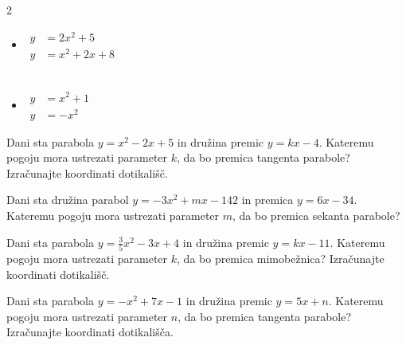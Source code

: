 \begin{naloga}
\begin{multicols}{2}
\begin{itemize}
                    \item $ \begin{aligned}
                        y&=2x^2+5 \\ y&=x^2+2x+8
                    \end{aligned} $ \\~

                    \item $ \begin{aligned}
                        y&=x^2+1 \\ y&=-x^2
                    \end{aligned} $
                \end{itemize}

            \end{multicols}

        \end{naloga}

        

            \begin{naloga}
                Dani sta parabola $y=x^2-2x+5$ in družina premic $y=kx-4$.
                Kateremu pogoju mora ustrezati parameter $k$, da bo premica tangenta parabole?
                Izračunajte koordinati dotikališč.
                                
            \end{naloga}


            \begin{naloga}
                Dani sta družina parabol $y=-3x^2+mx-142$ in premica $y=6x-34$.
                Kateremu pogoju mora ustrezati parameter $m$, da bo premica sekanta parabole?
                
            \end{naloga}


            \begin{naloga}
                Dani sta parabola $y=\frac{3}{5}x^2-3x+4$ in družina premic $y=kx-11$.
                Kateremu pogoju mora ustrezati parameter $k$, da bo premica mimobežnica?
                Izračunajte koordinati dotikališč.
                                
            \end{naloga}


            \begin{naloga}
                Dani sta parabola $y=-x^2+7x-1$ in družina premic $y=5x+n$.
                Kateremu pogoju mora ustrezati parameter $n$, da bo premica tangenta parabole?
                Izračunajte koordinati dotikališča.
                
            \end{naloga}

